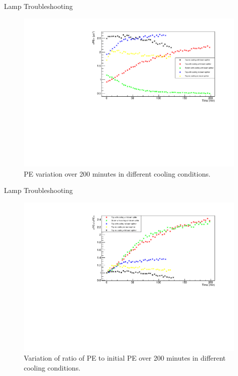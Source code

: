 \documentclass{beamer}
\begin{document}
\begin{frame}{Lamp Troubleshooting}
\begin{figure}
\centering
\includegraphics[height=0.5\textwidth]{NewLampPEAug5.pdf}
\caption{PE variation over 200 minutes in different cooling conditions.}
\end{figure}
\end{frame}

\begin{frame}{Lamp Troubleshooting}
\begin{figure}
\centering
\includegraphics[height=0.5\textwidth]{NewLampPERatioAug5.pdf}
\caption{Variation of ratio of PE to initial PE over 200 minutes in different cooling conditions.}
\end{figure}
\end{frame}
\end{document}
